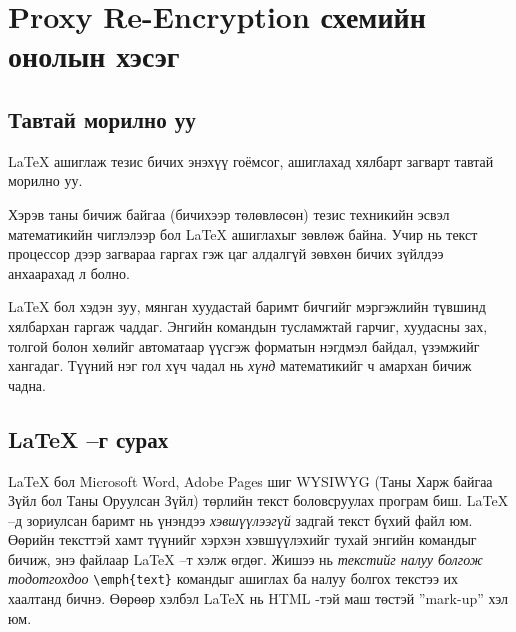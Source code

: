 
\chapter{Proxy Re-Encryption схемийн онолын хэсэг} %
\label{Chapter1} %
\pagecolor{white}

\newcommand{\keyword}[1]{\textbf{#1}}
\newcommand{\tabhead}[1]{\textbf{#1}}
\newcommand{\code}[1]{\texttt{#1}}
\newcommand{\file}[1]{\texttt{\bfseries#1}}
\newcommand{\option}[1]{\texttt{\itshape#1}}

\section{}

\section{Тавтай морилно уу}
\LaTeX{} ашиглаж тезис бичих энэхүү гоёмсог, ашиглахад хялбарт загварт тавтай морилно уу. 

Хэрэв таны бичиж байгаа (бичихээр төлөвлөсөн) тезис техникийн эсвэл математикийн чиглэлээр бол \LaTeX{} ашиглахыг зөвлөж байна. Учир нь текст процессор дээр загвараа гаргах гэж цаг алдалгүй зөвхөн бичих зүйлдээ анхаарахад л болно.

\LaTeX{} бол хэдэн зуу, мянган хуудастай баримт бичгийг мэргэжлийн түвшинд хялбархан гаргаж чаддаг. Энгийн командын тусламжтай гарчиг, хуудасны зах, толгой болон хөлийг автоматаар үүсгэж форматын нэгдмэл байдал, үзэмжийг хангадаг. Түүний нэг гол хүч чадал нь \emph{хүнд} математикийг ч амархан бичиж чадна.


\section{\LaTeX{} --г сурах}

\LaTeX{} бол Microsoft Word, Adobe Pages шиг \textsc{WYSIWYG} (Таны Харж байгаа Зүйл бол Таны Оруулсан Зүйл) төрлийн текст боловсруулах програм биш. \LaTeX{} --д зориулсан баримт нь үнэндээ \emph{хэвшүүлээгүй} задгай текст бүхий файл юм. Өөрийн тексттэй хамт түүнийг хэрхэн хэвшүүлэхийг тухай энгийн командыг бичиж, энэ файлаар \LaTeX{} --т хэлж өгдөг. Жишээ нь \emph{текстийг налуу болгож тодотгохдоо} \verb|\emph{text}| командыг ашиглах ба налуу болгох текстээ их хаалтанд бичнэ. Өөрөөр хэлбэл \LaTeX{} нь HTML -тэй маш төстэй ''{mark-up}'' хэл юм.

